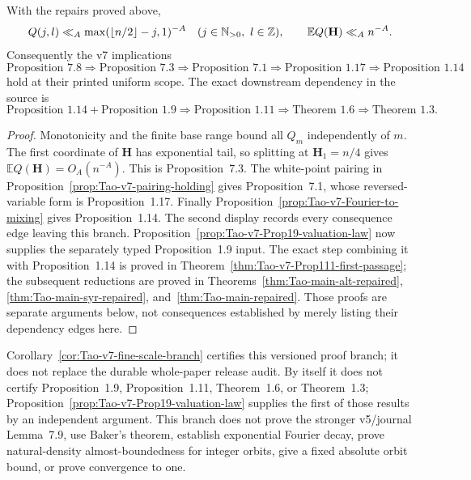 \begin{corollary}
\label{cor:Tao-v7-fine-scale-branch}
With the repairs proved above,
\[
 Q(j,l)\ll_A\max(\lfloor n/2\rfloor-j,1)^{-A}
 \quad(j\in\mathbb{N}_{>0},\ l\in\mathbb Z),
 \qquad \mathbb E Q(\mathbf H)\ll_A n^{-A}.
\]
Consequently the v7 implications
\[
 \text{Proposition 7.8}\Rightarrow
 \text{Proposition 7.3}\Rightarrow
 \text{Proposition 7.1}\Rightarrow
 \text{Proposition 1.17}\Rightarrow
 \text{Proposition 1.14}
\]
hold at their printed uniform scope.  The exact downstream dependency in the
source is
\[
 \text{Proposition 1.14}+\text{Proposition 1.9}
 \Rightarrow\text{Proposition 1.11}
 \Rightarrow\text{Theorem 1.6}
 \Rightarrow\text{Theorem 1.3}.
\]
\end{corollary}

\begin{proof}
Monotonicity and the finite base range bound all \(Q_m\) independently of
\(m\).  The first coordinate of \(\mathbf H\) has exponential tail, so
splitting at \(\mathbf H_1=n/4\) gives
\(\mathbb E Q(\mathbf H)=O_A(n^{-A})\).  This is Proposition~7.3.
The white-point pairing in
Proposition~\ref{prop:Tao-v7-pairing-holding} gives Proposition~7.1, whose
reversed-variable form is Proposition~1.17.  Finally
Proposition~\ref{prop:Tao-v7-Fourier-to-mixing} gives Proposition~1.14.
The second display records every consequence edge leaving this branch.
Proposition~\ref{prop:Tao-v7-Prop19-valuation-law} now supplies the separately
typed Proposition~1.9 input.  The exact step combining it with
Proposition~1.14 is proved in
Theorem~\ref{thm:Tao-v7-Prop111-first-passage}; the subsequent reductions are
proved in Theorems~\ref{thm:Tao-main-alt-repaired},
\ref{thm:Tao-main-syr-repaired}, and~\ref{thm:Tao-main-repaired}.
Those proofs are separate arguments below, not consequences established
by merely listing their dependency edges here.
\end{proof}

\begin{nonclaim}
Corollary~\ref{cor:Tao-v7-fine-scale-branch} certifies this versioned proof
branch; it does not replace the durable whole-paper release audit.  By itself
it does not certify Proposition~1.9, Proposition~1.11, Theorem~1.6, or
Theorem~1.3; Proposition~\ref{prop:Tao-v7-Prop19-valuation-law} supplies the
first of those results by an independent argument.  This branch does
not prove the stronger v5/journal Lemma~7.9, use Baker's theorem, establish
exponential Fourier decay, prove natural-density almost-boundedness for
integer orbits, give a fixed absolute orbit bound, or prove convergence to one.
\end{nonclaim}

